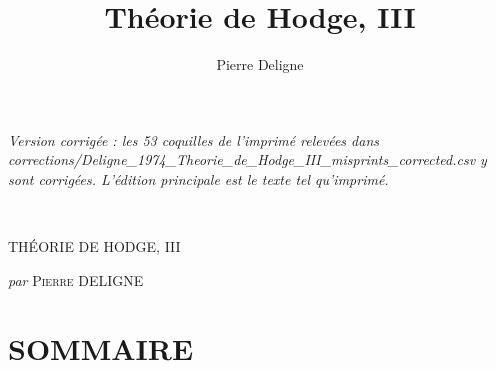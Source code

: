 \documentclass[11pt,leqno]{article}
\title{Théorie de Hodge, III}
\author{Pierre Deligne}
\date{}
\newcommand{\Page}[1]{\ifvmode\noindent\else\unskip\ \fi{\footnotesize\textcolor{gray}{[p.\,#1]}}\ \ignorespaces}
\begin{document}
\begin{center}\small\itshape Version corrigée : les 53 coquilles de l'imprimé relevées dans corrections/Deligne\_1974\_Theorie\_de\_Hodge\_III\_misprints\_corrected.csv y sont corrigées. L'édition principale est le texte tel qu'imprimé.\end{center}

\maketitle
\Page{5}

\begin{center}
{\Large THÉORIE DE HODGE, III\par}
\medskip
{\large \textit{par} \textsc{Pierre} DELIGNE\par}
\end{center}

\section*{\centering\normalfont SOMMAIRE}
\end{document}
